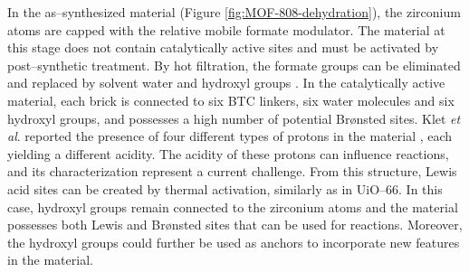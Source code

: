 In the as--synthesized material (Figure \ref{fig:MOF-808-dehydration}), the zirconium atoms are capped with the relative mobile formate modulator. The material at this stage does not contain catalytically active sites and must be activated by post--synthetic treatment. By hot filtration, the formate groups can be eliminated and replaced by solvent water and hydroxyl groups \cite{plessers2016zr, mautschke2018catalytic}. In the catalytically active material, each brick is connected to six BTC linkers, six water molecules and six hydroxyl groups, and possesses a high number of potential Br\o{}nsted sites. Klet \textit{et al}. reported the presence of four different types of protons in the material \cite{klet2016evaluation}, each yielding a different acidity. The acidity of these protons can influence reactions, and its characterization represent a current challenge. From this structure, Lewis acid sites can be created by thermal activation, similarly as in UiO--66. In this case, hydroxyl groups remain connected to the zirconium atoms and the material possesses both Lewis and Br\o{}nsted sites that can be used for reactions. Moreover, the hydroxyl groups could further be used as anchors to incorporate new features in the material. 

